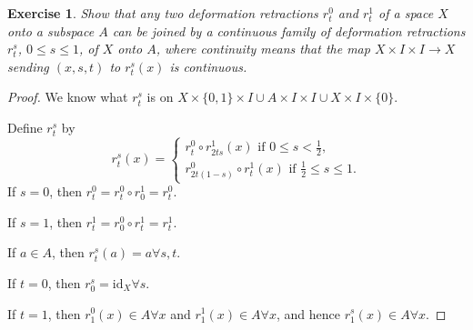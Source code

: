 \documentclass{article}
\newtheorem{exercise}{Exercise}[subsection]
\begin{document}
\begin{exercise}
Show that any two deformation retractions $r_t^0$ and $r_t^1$ of a space $X$ onto a subspace $A$ can be joined by a continuous family of deformation retractions $r_t^s$, $0\leq s\leq 1$, of $X$ onto $A$, where continuity means that the map $X\times I\times I\to X$ sending $(x,s,t)$ to $r_t^s(x)$ is continuous.
\end{exercise}
\begin{proof}
We know what $r_t^s$ is on $X\times\{0,1\}\times I\cup A\times I\times I\cup X\times I\times\{0\}$.

\noindent Define $r_t^s$ by\[r_t^s(x)=\begin{cases}
    r_t^0\circ r_{2ts}^1(x)\text{ if } 0\leq s <\frac{1}{2},\\r_{2t(1-s)}^0\circ r_t^1(x)\text{ if }\frac{1}{2}\leq s\leq 1.
\end{cases}\] If $s=0$, then $r_t^0=r_t^0\circ r_0^1=r_t^0$.

\noindent If $s=1$, then $r_t^1=r_0^0\circ r_t^1=r_t^1$.

\noindent If $a\in A$, then $r_t^s(a)=a\forall s,t$.

\noindent If $t=0$, then $r_0^s=\text{id}_X\forall s$.

\noindent If $t=1$, then $r_1^0(x)\in A\forall x$ and $r_1^1(x)\in A\forall x$, and hence $r_1^s(x)\in A\forall x$.
\end{proof}
\end{document}
